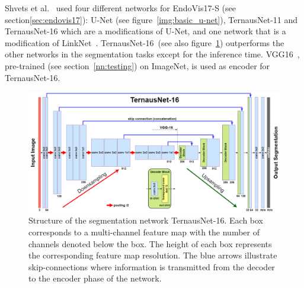 
%

Shvets et al.~\cite{Shvets2018} used four different networks for EndoVis17-S (see section\ref{sec:endovis17}):
U-Net (see figure~\ref{img:basic_u-net}), TernausNet-11 and TernausNet-16 which are a modifications of U-Net, and one network that is a modification of LinkNet~\cite{linknet2017Chaurasia}.
TernausNet-16~(see also figure~\ref{img:ternausnet16}) outperforms the other networks in the segmentation tasks except for the inference time.
VGG16~\cite{simonyan2014vgg}, pre-trained (see section~\ref{nn:testing}) on ImageNet, is used as encoder  for TernausNet-16.

\begin{figure}
	\centering
	\includegraphics[width=.8\textwidth]{images/networks/TernausNet16.png}
	\caption[TernausNet-16~\cite{Shvets2018}]{Structure of the segmentation network TernausNet-16. 
	Each box corresponds to a multi-channel feature map with the number of channels denoted below the box. 
	The height of each box represents the corresponding feature map resolution. 
	The blue arrows illustrate skip-connections where information is transmitted from the decoder
	to the encoder phase of the network.~\cite{Shvets2018}}
	\label{img:ternausnet16}
\end{figure}

